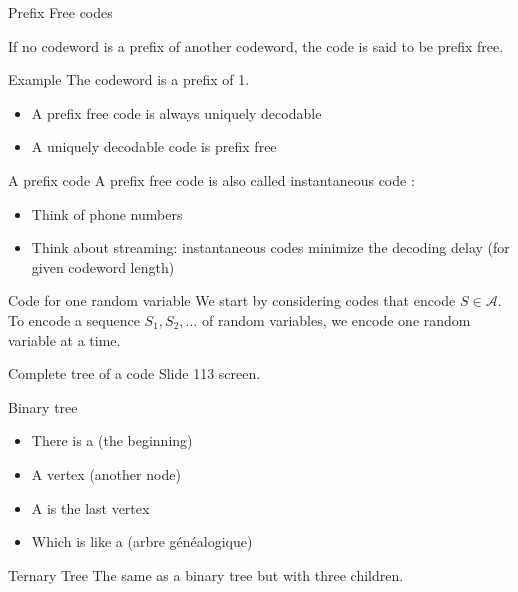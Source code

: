 \begin{parag}{Prefix Free codes}
    \begin{definition}
        If no codeword is a prefix of another codeword, the code is said to be prefix free.
    \end{definition}
   \begin{subparag}{Example}
        The codeword  is a prefix of 1. \\

       
   \end{subparag}
   \begin{itemize}
       \item A prefix free code is always uniquely decodable
       \item A uniquely decodable code is  prefix free
   \end{itemize}
   \begin{subparag}{A prefix code }
       A prefix free code is also called instantaneous code : 
       \begin{itemize}
           \item Think of phone numbers
           \item Think about streaming: instantaneous codes minimize the decoding delay (for given codeword length)
       \end{itemize}
   \end{subparag}
\end{parag}
 
\begin{parag}{Code for one random variable}
    We start by considering codes that encode  $ S \in \mathcal{A}$.
    \\
    To encode a sequence $S_1, S_2, \dots $ of random variables, we encode one random variable at a time.
\end{parag}

\begin{parag}{Complete tree of a code}
    Slide 113 screen.
\end{parag}
\begin{parag}{Binary tree}
    \begin{itemize}
        \item There is a  (the beginning)
        \item A vertex (another node)
        \item A  is the last vertex
        \item Which is like a (arbre généalogique)
    \end{itemize}
\end{parag}
\begin{parag}{Ternary Tree}
    The same as a binary tree but with three children.
\end{parag}

